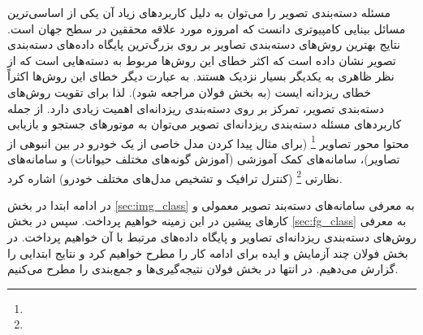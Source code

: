 \documentclass[11pt]{article}
\begin{document}
مسئله دسته‌بندی تصویر را می‌توان به دلیل کاربردهای زیاد آن یکی از اساسی‌ترین مسائل بینایی کامپیوتری دانست که امروزه مورد علاقه محققین در سطح جهان است. نتایج بهترین روش‌های دسته‌بندی تصاویر بر روی بزرگ‌ترین پایگاه داده‌های دسته‌بندی تصویر نشان داده است که اکثر خطای این روش‌ها مربوط به دسته‌هایی است که از نظر ظاهری به یکدیگر بسیار نزدیک هستند. به عبارت دیگر خطای این روش‌ها اکثراً خطای ریزدانه ایست (به بخش فولان مراجعه شود). لذا برای تقویت روش‌های دسته‌بندی تصویر، تمرکز بر روی دسته‌بندی ریزدانه‌ای اهمیت زیادی دارد.
از جمله کاربردهای مسئله دسته‌بندی ریزدانه‌ای تصویر می‌توان به موتورهای جستجو و بازیابی محتوا محور تصاویر
\footnote{}
(برای مثال پیدا کردن مدل خاصی از یک خودرو در بین انبوهی از تصاویر)، سامانه‌های کمک آموزشی (آموزش گونه‌های مختلف حیوانات) و سامانه‌های نظارتی
\footnote{}
(کنترل ترافیک و تشخیص مدل‌های مختلف خودرو) اشاره کرد.

در ادامه ابتدا در بخش
\ref{sec:img_class}
به معرفی سامانه‌های دسته‌بند تصویر معمولی و کارهای پیشین در این زمینه خواهیم پرداخت. سپس در بخش
\ref{sec:fg_class}
به معرفی روش‌های دسته‌بندی ریزدانه‌ای تصاویر و پایگاه داده‌های مرتبط با آن خواهیم پرداخت. در بخش فولان چند آزمایش و ایده برای ادامه کار را مطرح خواهیم کرد و نتایج ابتدایی را گزارش می‌دهیم. در انتها در بخش فولان نتیجه‌گیری‌ها و جمع‌بندی را مطرح می‌کنیم.

\end{document}
